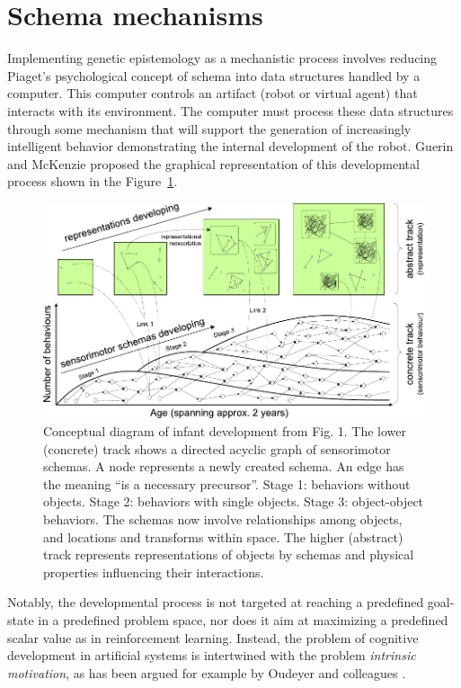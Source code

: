 \documentclass[runningheads]{llncs}
\begin{document}
\section{Schema mechanisms}
\label{sec:schema}
%
Implementing genetic epistemology as a mechanistic process involves reducing Piaget's psychological concept of schema into data structures handled by a computer. 
This computer controls an artifact (robot or virtual agent) that interacts with its environment.
The computer must process these data structures through some mechanism that will support the generation of increasingly intelligent behavior demonstrating the internal development of the robot.
Guerin and McKenzie \cite{guerin_survey_2013} proposed the graphical representation of this developmental process shown in the Figure~\ref{fig:general}.
%
\begin{figure}
	\includegraphics[width=\textwidth]{Figure_1_guerin.pdf}
	\caption{Conceptual diagram of infant development from \cite{guerin_survey_2013} Fig. 1.
	The lower (concrete) track shows a directed acyclic graph of sensorimotor schemas. 
	A node represents a newly created schema. 
	An edge has the meaning ``is a necessary precursor''. 
    Stage 1: behaviors without objects. 
    Stage 2: behaviors with single objects. 
    Stage 3: object-object behaviors. The schemas now involve relationships among objects, and locations and transforms within space.
    The higher (abstract) track represents representations of objects by schemas and physical properties influencing their interactions.} 
	\label{fig:general}
\end{figure}

Notably, the developmental process is not targeted at reaching a predefined goal-state in a predefined problem space, nor does it aim at maximizing a predefined scalar value as in reinforcement learning.
Instead, the problem of cognitive development in artificial systems is intertwined with the problem \textit{intrinsic motivation}, as has been argued for example by  
Oudeyer and colleagues \cite{oudeyer_intrinsic_2007}. 
\end{document}

